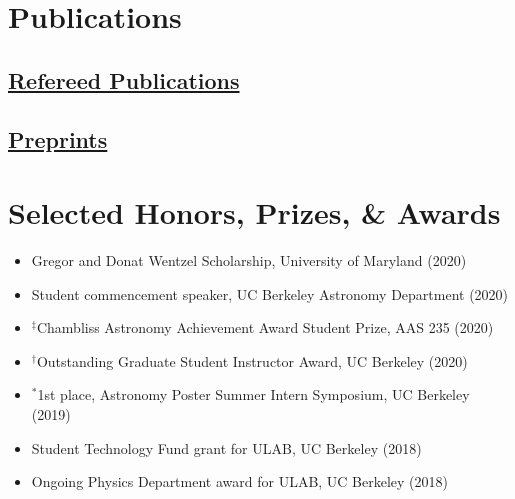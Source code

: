 \documentclass[letterpaper,10.5pt]{article}
\newcommand{\resumeItem}[2]{
  \item\small{
    \textbf{#1}{#2 \vspace{-2pt}}
  }
}
\newcommand{\resumeSubHeadingListStart}{\begin{itemize}[leftmargin=*]}
\newcommand{\resumeSubHeadingListEnd}{\end{itemize}}
\newcommand{\resumeItemListStart}{\begin{itemize}}
\newcommand{\resumeItemListEnd}{\end{itemize}\vspace{-5pt}}
\newcommand{\shorterSection}[1]{\vspace{-10pt}\section{#1}}
\newcommand{\shortershorterSection}[1]{\vspace{-10pt}\subsection{#1}}
\begin{document}

\shorterSection{Publications}

\vspace{4pt}
\shortershorterSection{\underline{Refereed Publications}}
\resumeSubHeadingListStart
\small
\begin{list}{}{\cvlist}
    
  \end{list}
\resumeSubHeadingListEnd

\shortershorterSection{\underline{Preprints}}
\resumeSubHeadingListStart
\small
\begin{list}{}{\cvlist}

\end{list}
\resumeSubHeadingListEnd

\shorterSection{Selected Honors, Prizes, \& Awards}
\resumeItemListStart
  \resumeItem{}{Gregor and Donat Wentzel Scholarship, University of Maryland (2020)}
  \resumeItem{}{Student commencement speaker, UC Berkeley Astronomy Department (2020)}
  \resumeItem{}{$^\ddagger$Chambliss Astronomy Achievement Award Student Prize, AAS 235 (2020)}
  \resumeItem{}{$^\dagger$Outstanding Graduate Student Instructor Award, UC Berkeley (2020)}
  \resumeItem{}{$^*$1st place, Astronomy Poster Summer Intern Symposium, UC Berkeley (2019)}
  \resumeItem{}{Student Technology Fund grant for ULAB, UC Berkeley (2018)}
  \resumeItem{}{Ongoing Physics Department award for ULAB, UC Berkeley (2018)}

\resumeItemListEnd
\end{document}
